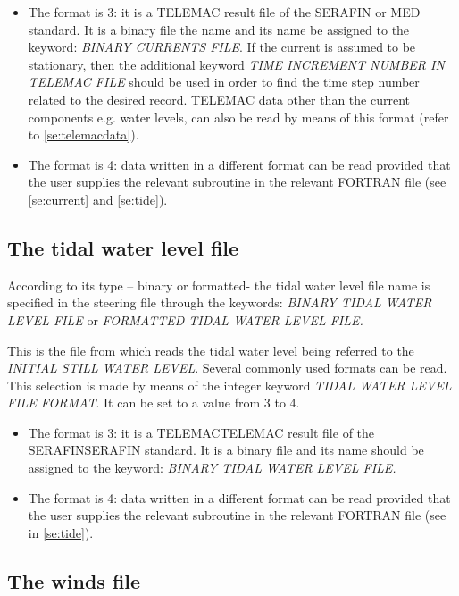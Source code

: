 \begin{itemize}
\item  The format is 3: it is a TELEMAC result file of the SERAFIN or MED standard. It is a binary file the name and its name be assigned to the keyword: \textit{BINARY CURRENTS FILE}. If the current is assumed to be stationary, then the additional keyword \textit{TIME INCREMENT NUMBER IN TELEMAC FILE }should be used in order to find the time step number related to the desired record. TELEMAC data other than the current components e.g. water levels, can also be read by means of this format (refer to \ref{se:telemacdata}).

\item  The format is 4: data written in a different format can be read provided that the user supplies the relevant subroutine in the relevant FORTRAN file (see \ref{se:current} and \ref{se:tide}).
\end{itemize}


\subsection{ The tidal water level file}
\label{se:tidalfile}
 According to its type -- binary or formatted- the tidal water level file name is specified in the steering file through the keywords: \textit{BINARY TIDAL WATER LEVEL FILE }or\textit{ FORMATTED TIDAL WATER LEVEL FILE.}

 This is the file from which \tomawac reads the tidal water level being referred to the \textit{INITIAL STILL WATER LEVEL}. Several commonly used formats can be read. This selection is made by means of the integer keyword \textit{TIDAL WATER LEVEL FILE FORMAT}. It can be set to a value from 3 to 4.

\begin{itemize}
\item  The format is 3: it is a TELEMACTELEMAC result file of the SERAFINSERAFIN standard. It is a binary file and its name should be assigned to the keyword: \textit{BINARY TIDAL WATER LEVEL FILE.}

\item  The format is 4: data written in a different format can be read provided that the user supplies the relevant subroutine in the relevant FORTRAN file (see in \ref{se:tide}).
\end{itemize}


\subsection{ The winds file}
\label{se:windfile}

